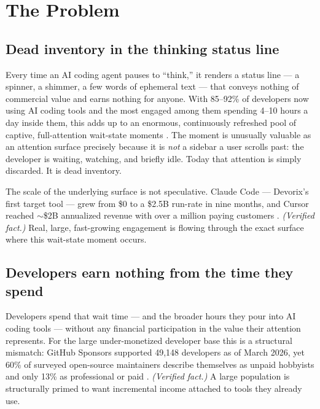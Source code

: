 \chapter{The Problem}
\label{ch:problem}

\section{Dead inventory in the thinking status line}

Every time an AI coding agent pauses to ``think,'' it renders a status line ---
a spinner, a shimmer, a few words of ephemeral text --- that conveys nothing of
commercial value and earns nothing for anyone. With 85--92\% of developers now
using AI coding tools and the most engaged among them spending 4--10 hours a
day inside them, this adds up to an enormous, continuously refreshed pool of
captive, full-attention wait-state moments \citep{masterplan_2026}. The
moment is unusually valuable as an attention surface precisely because it is
\emph{not} a sidebar a user scrolls past: the developer is waiting, watching,
and briefly idle. Today that attention is simply discarded. It is dead
inventory.

The scale of the underlying surface is not speculative. Claude Code ---
Devorix's first target tool --- grew from \$0 to a \$2.5B run-rate in nine
months, and Cursor reached $\sim$\$2B annualized revenue with over a million
paying customers \citep{masterplan_2026}. \emph{(Verified fact.)} Real,
large, fast-growing engagement is flowing through the exact surface where this
wait-state moment occurs.

\section{Developers earn nothing from the time they spend}

Developers spend that wait time --- and the broader hours they pour into AI
coding tools --- without any financial participation in the value their
attention represents. For the large under-monetized developer base this is a
structural mismatch: GitHub Sponsors supported 49{,}148 developers as of March
2026, yet 60\% of surveyed open-source maintainers describe themselves as
unpaid hobbyists and only 13\% as professional or paid
\citep{customerproduct_2026}. \emph{(Verified fact.)} A large population is
structurally primed to want incremental income attached to tools they already
use.


